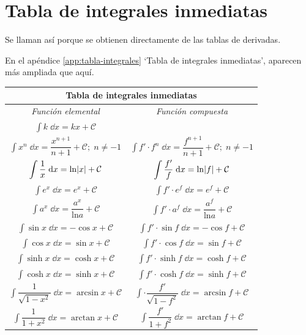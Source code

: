	
	\section{Tabla de integrales inmediatas}
	
	Se llaman así porque se obtienen directamente de las tablas de derivadas. 
	
	En el apéndice \ref{app:tabla-integrales} `Tabla de integrales inmediatas', aparecen más ampliada que aquí.
	

\begin{table}[h]
\centering
\def\arraystretch{2}
\begin{tabular}{|c|c|}
\hline
\multicolumn{2}{|c|}{Tabla de integrales inmediatas} \\ \hline
      \emph{Función elemental} & 	\emph{Función compuesta}      \\ \hline
  $\displaystyle \int k \; \dd x=kx+\mathcal{C}$    &  $\quad$        \\ \hline
   $\displaystyle \int x^n \; \dd x = \dfrac {x^{n+1}}{n+1} +\mathcal{C}; \; n\neq -1$         &   $\displaystyle \int f'\cdot  f^n \; \dd x = \dfrac {f^{n+1}}{n+1} +\mathcal{C}; \; n\neq -1$          \\ \hline
     $\displaystyle \displaystyle \int {\dfrac 1 x \; \dd x} = \mathrm{ln}|x|+\mathcal{C}$      &     $\displaystyle \displaystyle \int {\dfrac {f'} {f} \; \dd x} = \mathrm{ln}|f|+\mathcal{C}$       \\ \hline
 $\displaystyle \int e^x\; \dd x= e^x +\mathcal{C}$          &    $\displaystyle \int f' \cdot  e^f\; \dd x= e^f +\mathcal{C}$         \\ \hline
  $\displaystyle \int a^x\; \dd x= \dfrac {a^x}{\mathrm{ln}a} +\mathcal{C}$          &    $\displaystyle \int f' \cdot  a^f\; \dd x= \dfrac{a^f}{\mathrm{ln}a} +\mathcal{C}$         \\ \hline
  $\displaystyle \int \sin x \; \dd x= - \cos x + \mathcal{C}$         &  $\displaystyle \int f'\cdot \sin f \; \dd x= - \cos f + \mathcal{C}$           \\ \hline
    $\displaystyle \int \cos x \; \dd x=\sin x + \mathcal{C}$         &  $\displaystyle \int f'\cdot \cos f \; \dd x= \sin f + \mathcal{C}$           \\ \hline
     $\displaystyle \int \sinh x \; \dd x=  \cosh x + \mathcal{C}$         &  $\displaystyle \int f'\cdot \sinh f \; \dd x= \cosh f + \mathcal{C}$           \\ \hline
        $\displaystyle \int \cosh x \; \dd x=  \sinh x + \mathcal{C}$         &  $\displaystyle \int f'\cdot \cosh f \; \dd x= \sinh f + \mathcal{C}$           \\ \hline
    $\displaystyle \int \dfrac {1}{\sqrt{1-x^2}}\; \dd x = \arcsin x + \mathcal{C}$       &      $\displaystyle \int  \cdot \dfrac {f'}{\sqrt{1-f^2}}\; \dd x = \arcsin f + \mathcal{C}$         \\ \hline
     $\displaystyle \int \dfrac {1}{1+x^2}\; \dd x = \arctan x + \mathcal{C}$      &     $\displaystyle \int \dfrac {f'}{1+f^2}\; \dd x = \arctan f + \mathcal{C}$        \\ \hline
\end{tabular}
\end{table}

